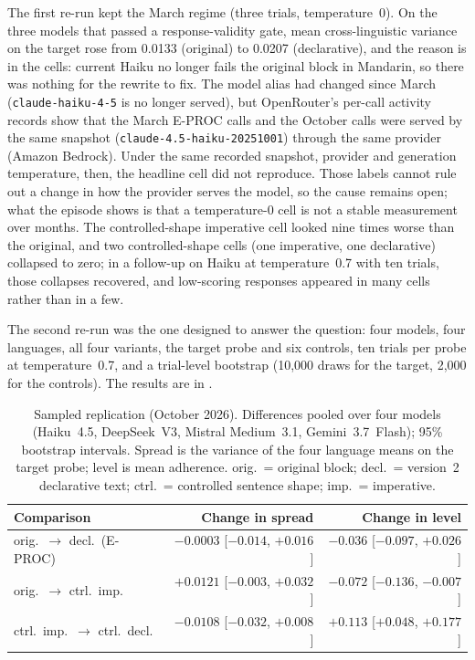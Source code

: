 \documentclass[11pt,a4paper]{article}
\begin{document}
The first re-run kept the March regime (three trials, temperature~0).
On the three models that passed a response-validity gate, mean
cross-linguistic variance on the target rose from 0.0133 (original) to
0.0207 (declarative), and the reason is in the cells: current Haiku no
longer fails the original block in Mandarin, so there was nothing for
the rewrite to fix. The model alias had changed since March
(\texttt{claude-haiku-4-5} is no longer served), but OpenRouter's
per-call activity records show that the March E-PROC calls and the
October calls were served by the same snapshot
(\texttt{claude-4.5-haiku-20251001}) through the same provider
(Amazon Bedrock). Under the same recorded snapshot, provider and
generation temperature, then, the headline cell did not reproduce.
Those labels cannot rule out a change in how the provider serves the
model, so the cause remains open; what the episode shows is that a
temperature-0 cell is not a stable measurement over months. The
controlled-shape imperative cell looked nine times worse than the
original, and two controlled-shape cells (one imperative, one
declarative) collapsed to zero; in a follow-up on Haiku at
temperature~0.7 with ten trials, those collapses recovered, and
low-scoring responses appeared in many cells rather than in a few.

The second re-run was the one designed to answer the question: four
models, four languages, all four variants, the target probe and six
controls, ten trials per probe at temperature~0.7, and a trial-level
bootstrap (10{,}000 draws for the target, 2{,}000 for the controls). The
results are in .

\begin{table}[ht]
\centering
\caption{Sampled replication (October 2026). Differences pooled over
four models (Haiku~4.5, DeepSeek~V3, Mistral Medium~3.1,
Gemini~3.7~Flash); 95\% bootstrap intervals. Spread is the variance of
the four language means on the target probe; level is mean adherence.  orig.\ = original block; decl.\ = version~2 declarative text; ctrl.\ = controlled sentence shape; imp.\ = imperative.}
\label{tab:replication}
\begin{tabular}{lrr}
\toprule
Comparison & Change in spread & Change in level \\
\midrule
orig.\ $\to$ decl.\ (E-PROC) & $-0.0003$ [$-0.014$, $+0.016$] & $-0.036$ [$-0.097$, $+0.026$] \\
orig.\ $\to$ ctrl.\ imp.\ & $+0.0121$ [$-0.003$, $+0.032$] & $\mathbf{-0.072}$ [$-0.136$, $-0.007$] \\
ctrl.\ imp.\ $\to$ ctrl.\ decl.\ & $-0.0108$ [$-0.032$, $+0.008$] & $\mathbf{+0.113}$ [$+0.048$, $+0.177$] \\
\bottomrule
\end{tabular}
\end{table}
\end{document}
